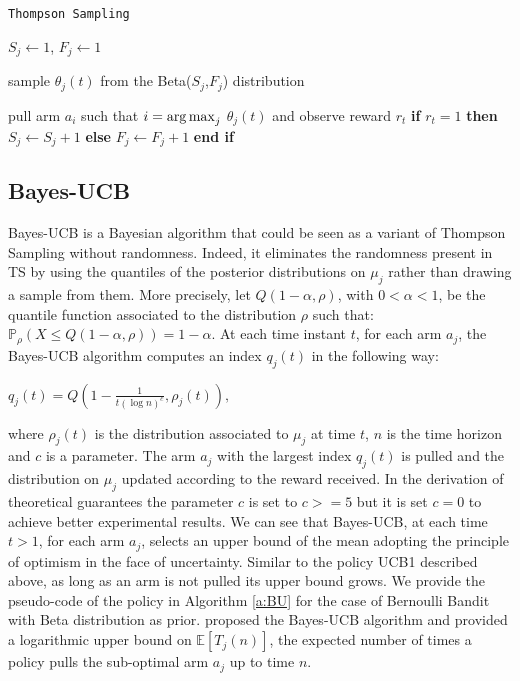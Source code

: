 \begin{algorithm}[H]
	\caption{\texttt{Thompson Sampling}}
	\begin{scriptsize}
		\begin{algorithmic}[1]						
			 
			\State $S_j \gets 1 $, $F_j \gets 1 $
			\EndFor
			 
			
			\State sample $\theta_j(t)$ from the Beta($S_j$,$F_j$) distribution
					
			\EndFor
			\State pull arm $a_i$ such that  $i = \operatorname*{arg\,max}_j$ $\theta_j(t) $ and observe reward ${r_t}$	
			\State 	\textbf{if} $r_t=1$  \textbf{then} $S_j \gets S_j + 1$ \textbf{else}  $F_j \gets F_j + 1$  \textbf{end if}
			
			
			\EndFor	
		\end{algorithmic}
	\end{scriptsize}
	\label{a:TS}
\end{algorithm}


\subsection*{Bayes-UCB}
Bayes-UCB is a Bayesian algorithm  that could be seen as a variant of Thompson Sampling without randomness. Indeed, it eliminates the randomness present in TS by using the quantiles of the posterior distributions on $\mu_j$ rather than drawing a sample from them. More precisely, let $Q(1-\alpha,\rho)$, with $0< \alpha<1$, be the quantile function associated to the distribution $\rho$ such that: $ \mathbb{P}_\rho(X\leq Q(1-\alpha,\rho))=1-\alpha$. At each time instant $t$, for each arm $a_j$, the Bayes-UCB algorithm computes an index $q_j(t)$ in the following way: \begin{center}
$ q_j(t) = Q(1-\frac{1}{t(\log n)^c},\rho_j(t)) ,$
\end{center}where $\rho_j(t)$ is the distribution associated to $\mu_j$ at time $t$, $n$ is the time horizon and $c$ is a parameter. The arm $a_j$ with the largest index $q_j(t)$ is pulled and the distribution on $\mu_j$ updated according to the reward received. In the derivation of theoretical guarantees the parameter $c$ is set to $c>=5$ but it is set $c=0$ to achieve better experimental results. We can see that Bayes-UCB, at each time $t>1$, for each arm $a_j$, selects an upper bound of the mean adopting the principle of optimism in the face of uncertainty. Similar to the policy UCB1 described above, as long as an arm is not pulled its upper bound grows. We provide the pseudo-code of the policy in Algorithm \ref{a:BU} for the case of Bernoulli Bandit with Beta distribution as prior. \cite{kaufmann2012bayesian} proposed the Bayes-UCB algorithm and provided a logarithmic upper bound on $\mathbb{E}[T_j(n)]$, the expected number of times a policy pulls the sub-optimal arm $a_j$ up to time $n$.

